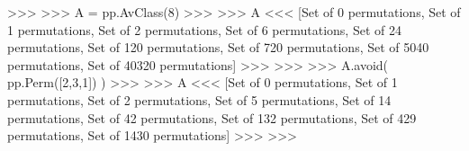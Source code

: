 \documentclass[]{article}
\newenvironment{Shaded}{}{}
\newcommand{\DecValTok}[1]{\textcolor[rgb]{0.25,0.63,0.44}{{#1}}}
\newcommand{\NormalTok}[1]{{#1}}
\begin{document}
\begin{Shaded}
\begin{Highlighting}[]
\NormalTok{>>> }
\NormalTok{>>> A = pp.AvClass(}\DecValTok{8}\NormalTok{)}
\NormalTok{>>> }
\NormalTok{>>> A}
\NormalTok{<<< }
\NormalTok{[Set of }\DecValTok{0} \NormalTok{permutations,}
 \NormalTok{Set of }\DecValTok{1} \NormalTok{permutations,}
 \NormalTok{Set of }\DecValTok{2} \NormalTok{permutations,}
 \NormalTok{Set of }\DecValTok{6} \NormalTok{permutations,}
 \NormalTok{Set of }\DecValTok{24} \NormalTok{permutations,}
 \NormalTok{Set of }\DecValTok{120} \NormalTok{permutations,}
 \NormalTok{Set of }\DecValTok{720} \NormalTok{permutations,}
 \NormalTok{Set of }\DecValTok{5040} \NormalTok{permutations,}
 \NormalTok{Set of }\DecValTok{40320} \NormalTok{permutations]}
\NormalTok{>>> }
\NormalTok{>>> }
\NormalTok{>>> A.avoid( pp.Perm([}\DecValTok{2}\NormalTok{,}\DecValTok{3}\NormalTok{,}\DecValTok{1}\NormalTok{]) )}
\NormalTok{>>> }
\NormalTok{>>> A}
\NormalTok{<<< }
\NormalTok{[Set of }\DecValTok{0} \NormalTok{permutations,}
 \NormalTok{Set of }\DecValTok{1} \NormalTok{permutations,}
 \NormalTok{Set of }\DecValTok{2} \NormalTok{permutations,}
 \NormalTok{Set of }\DecValTok{5} \NormalTok{permutations,}
 \NormalTok{Set of }\DecValTok{14} \NormalTok{permutations,}
 \NormalTok{Set of }\DecValTok{42} \NormalTok{permutations,}
 \NormalTok{Set of }\DecValTok{132} \NormalTok{permutations,}
 \NormalTok{Set of }\DecValTok{429} \NormalTok{permutations,}
 \NormalTok{Set of }\DecValTok{1430} \NormalTok{permutations]}
\NormalTok{>>> }
\NormalTok{>>> }
\end{Highlighting}
\end{Shaded}
\end{document}
